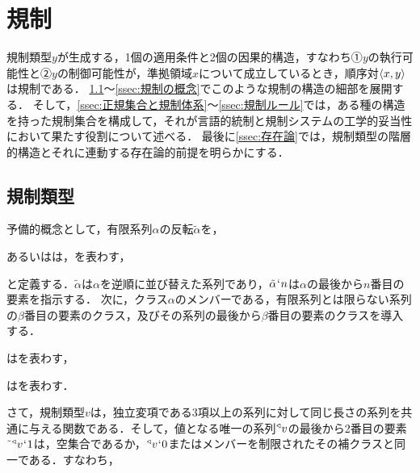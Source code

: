 
\section{規制}
\label{sec:規制}

規制類型$y$が生成する，1個の適用条件と2個の因果的構造，すなわち①$y$の執行可能性と②$y$の制御可能性が，準拠領域$x$について成立しているとき，順序対$\langle x,y \rangle$は規制である．
\ref{ssec:規制類型}〜\ref{ssec:規制の概念}でこのような規制の構造の細部を展開する．
そして，\ref{ssec:正規集合と規制体系}〜\ref{ssec:規制ルール}では，ある種の構造を持った規制集合を構成して，それが言語的統制と規制システムの工学的妥当性において果たす役割について述べる．
最後に\ref{ssec:存在論}では，規制類型の階層的構造とそれに連動する存在論的前提を明らかにする．


\subsection{規制類型}
\label{ssec:規制類型}

予備的概念として，有限系列$\alpha$の反転$ \tilde{\alpha} $を，
\begin{df}
\label{df:系列の反転}
\kagi{$\tilde{\alpha}$}あるいは\kagi{$\tildel{\alpha}$}は，を表わす，
\end{df}
\noindent と定義する．$\tilde{\alpha}$は$\alpha$を逆順に並び替えた系列であり，$\tilde{\alpha}{\mspace{1mu}{`}\mspace{1mu}} n$は$ \alpha $の最後から$n$番目の要素を指示する．
次に，クラス$\alpha$のメンバーである，有限系列とは限らない系列の$\beta$番目の要素のクラス，及びその系列の最後から$\beta$番目の要素のクラスを導入する．

\begin{df}
\label{df:メンバーの系列要素}
\kagi{$
    \msec{\alpha}{\beta}
$}はを表わす，
\end{df}

\begin{df}
\label{df:メンバーの反転系列要素}
\kagi{$
    \mser{\alpha}{\beta}
$}はを表わす．
\end{df}

さて，規制類型$v$は，独立変項である$3$項以上の系列に対して同じ長さの系列を共通に与える関数である．そして，値となる唯一の系列${^\triangleleft}v$の最後から2番目の要素$ \tilde{\:\:}{^\triangleleft}v{\mspace{1mu}{`}\mspace{1mu}} 1 $は，空集合であるか，$ {^\triangleleft}v{\mspace{1mu}{`}\mspace{1mu}} 0 $またはメンバーを制限されたその補クラスと同一である．すなわち，

